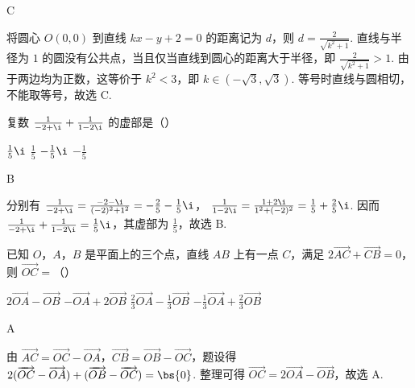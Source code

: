 \begin{answer}
C
\end{answer}

\begin{solution}
将圆心 \(O(0,0)\) 到直线 \(kx-y+2=0\) 的距离记为 \(d\)，则
\(d=\frac{2}{\sqrt{k^2+1}}\). 直线与半径为 \(1\) 的圆没有公共点，当且仅当直线到圆心的距离大于半径，即
\(\frac{2}{\sqrt{k^2+1}}>1\). 由于两边均为正数，这等价于 \(k^2<3\)，即 \(k\in(-\sqrt{3},\sqrt{3})\). 等号时直线与圆相切，不能取等号，故选 C.
\end{solution}

\begin{problem}
复数 \( \frac{1}{-2+\i} + \frac{1}{1-2\i} \) 的虚部是（\quad）

\choices
    {\(\frac{1}{5}\i\)}
    {\(\frac{1}{5}\)}
    {\(-\frac{1}{5}\i\)}
    {\(-\frac{1}{5}\)}
\end{problem}

\begin{answer}
B
\end{answer}

\begin{solution}
分别有
\(\frac{1}{-2+\i}=\frac{-2-\i}{(-2)^2+1^2}=-\frac{2}{5}-\frac{1}{5}\i\)，
\(\frac{1}{1-2\i}=\frac{1+2\i}{1^2+(-2)^2}=\frac{1}{5}+\frac{2}{5}\i\). 因而
\(\frac{1}{-2+\i}+\frac{1}{1-2\i}=\frac{1}{5}\i\)，其虚部为 \(\frac{1}{5}\)，故选 B.
\end{solution}

\begin{problem}
已知 \(O\)，\(A\)，\(B\) 是平面上的三个点，直线 \(AB\) 上有一点 \(C\)，满足 \(2\overrightarrow{AC} + \overrightarrow{CB} = 0\)，则 \(\overrightarrow{OC} =\)（\quad）

\choices
    {\(2\overrightarrow{OA} -\overrightarrow{OB}\)}
    {\(-\overrightarrow{OA} +2\overrightarrow{OB}\)}
    {\(\frac{2}{3}\overrightarrow{OA} -\frac{1}{3}\overrightarrow{OB}\)}
    {\(-\frac{1}{3}\overrightarrow{OA} +\frac{2}{3}\overrightarrow{OB}\)}
\end{problem}

\begin{answer}
A
\end{answer}

\begin{solution}
由 \(\overrightarrow{AC}=\overrightarrow{OC}-\overrightarrow{OA}\)，\(\overrightarrow{CB}=\overrightarrow{OB}-\overrightarrow{OC}\)，题设得
\(2(\overrightarrow{OC}-\overrightarrow{OA})+(\overrightarrow{OB}-\overrightarrow{OC})=\bs{0}\). 整理可得
\(\overrightarrow{OC}=2\overrightarrow{OA}-\overrightarrow{OB}\)，故选 A.
\end{solution}

